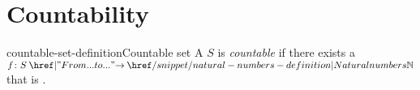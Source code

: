 \documentclass[preview]{standalone}
\begin{document}
\genpage

\section{Countability}

\begin{snippetdefinition}{countable-set-definition}{Countable set}
    A \set \(S\) is \textit{countable} if there exists
    a \function \(f\colon S\to \naturalnumbers\) that is \injective.
\end{snippetdefinition}
\end{document}
